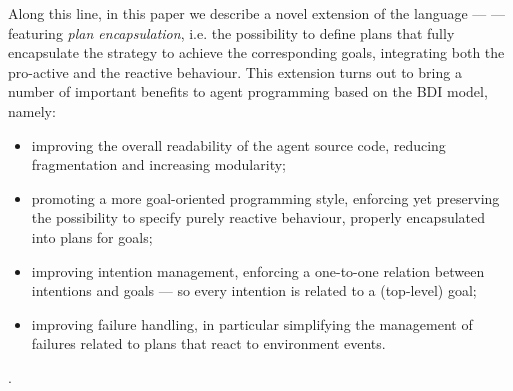 %
Along this line, in this paper we describe a novel extension of the
{\asl} language ---  --- featuring \emph{plan encapsulation}, i.e. the possibility to define plans that fully
encapsulate the strategy to achieve the corresponding goals,
integrating both the pro-active and the reactive behaviour.
%
%
This extension turns out to bring a number of important benefits to
agent programming based on the BDI model, namely:
%
\begin{itemize}
\item improving the overall readability of the agent source code,
  reducing fragmentation and increasing modularity;
\item promoting a more goal-oriented programming style, enforcing yet
  preserving the possibility to specify purely reactive behaviour,
  properly encapsulated into plans for goals;
\item improving intention management, enforcing a one-to-one relation
  between intentions and goals --- so every intention is related to a
  (top-level) goal;
\item improving failure handling, in particular simplifying the
  management of failures related to plans that react to environment
  events.
\end{itemize}
%
.
%

\bigskip


